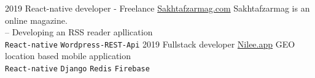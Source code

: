 \begin{entrylist}
    \entry
    {2019}
    {React-native developer - Freelance}
    {{\href{https://www.sakhtafzarmag.com/}{Sakhtafzarmag.com}}}
    {
        Sakhtafzarmag is an online magazine. \\
        -- Developing an RSS reader apllication \\
        \texttt{React-native}\slashsep
        \texttt{Wordpress-REST-Api}\slashsep
    }
    \entry
    {2019}
    {Fullstack developer}
    {{\href{https://www.nilee.app/}{Nilee.app}}}
    {
        GEO location based mobile application \\
        \texttt{React-native}\slashsep
        \texttt{Django}\slashsep
        \texttt{Redis}\slashsep
        \texttt{Firebase}\\
    }
\end{entrylist}



